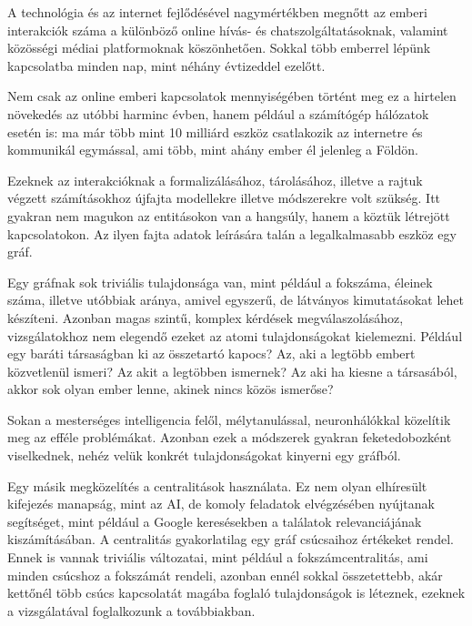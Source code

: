 \documentclass[12pt,numbers=noenddot]{report}
\begin{document}
A technológia és az internet fejlődésével nagymértékben megnőtt az emberi 
interakciók száma a különböző online hívás- és chatszolgáltatásoknak, valamint
közösségi médiai platformoknak köszönhetően. Sokkal több emberrel lépünk
kapcsolatba minden nap, mint néhány évtizeddel ezelőtt.

Nem csak az online emberi kapcsolatok mennyiségében történt meg ez a hirtelen
növekedés az utóbbi harminc évben, hanem például a számítógép hálózatok esetén 
is: ma már több mint 10 milliárd eszköz csatlakozik az internetre és kommunikál 
egymással, ami több, mint ahány ember él jelenleg a Földön.

Ezeknek az interakcióknak a formalizálásához, tárolásához, illetve
a rajtuk végzett számításokhoz újfajta modellekre illetve módszerekre volt 
szükség. Itt gyakran nem magukon az entitásokon van a hangsúly, hanem a köztük
létrejött kapcsolatokon. Az ilyen fajta adatok leírására talán a legalkalmasabb
eszköz egy gráf.

Egy gráfnak sok triviális tulajdonsága van, mint például a fokszáma, éleinek 
száma, illetve utóbbiak aránya, amivel egyszerű, de látványos kimutatásokat lehet
készíteni. Azonban magas szintű, komplex kérdések megválaszolásához, 
vizsgálatokhoz nem elegendő ezeket az atomi tulajdonságokat kielemezni. 
Például egy baráti társaságban ki az összetartó kapocs? Az, aki a legtöbb embert
közvetlenül ismeri? Az akit a legtöbben ismernek? Az aki ha kiesne a társasából,
akkor sok olyan ember lenne, akinek nincs közös ismerőse?

Sokan a mesterséges intelligencia felől, mélytanulással, neuronhálókkal 
közelítik meg az efféle problémákat. Azonban ezek a módszerek gyakran 
feketedobozként viselkednek, nehéz velük konkrét tulajdonságokat kinyerni egy 
gráfból.

Egy másik megközelítés a centralitások használata. Ez nem olyan elhíresült 
kifejezés manapság, mint az AI, de komoly feladatok elvégzésében nyújtanak 
segítséget, mint például a Google keresésekben a találatok relevanciájának 
kiszámításában.
A centralitás gyakorlatilag egy gráf csúcsaihoz értékeket rendel. Ennek is 
vannak triviális változatai, mint például a fokszámcentralitás, ami minden 
csúcshoz a fokszámát rendeli, azonban ennél sokkal összetettebb, 
akár kettőnél több csúcs kapcsolatát magába foglaló tulajdonságok is léteznek, 
ezeknek a vizsgálatával foglalkozunk a továbbiakban.

\end{document}
